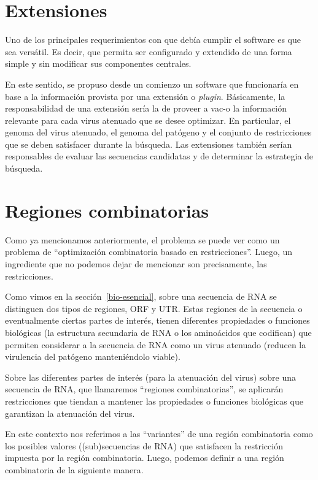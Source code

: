 \section{Extensiones}

Uno de los principales requerimientos con que deb\'ia cumplir el software es
que sea vers\'atil. Es decir, que permita ser configurado y extendido de una
forma simple y sin modificar sus componentes centrales.

En este sentido, se propuso desde un comienzo un software que funcionar\'ia en
base a la informaci\'on provista por una extensi\'on o \textit{plugin}.
B\'asicamente, la responsabilidad de una extensi\'on ser\'ia la de proveer a
\ac{vac-o} la informaci\'on relevante para cada virus atenuado que se desee
optimizar. En particular, el genoma del virus atenuado, el genoma del
pat\'ogeno y el conjunto de restricciones que se deben satisfacer durante la
b\'usqueda. Las extensiones tambi\'en ser\'ian responsables de evaluar las
secuencias candidatas y de determinar la estrategia de b\'usqueda.


\section{Regiones combinatorias}

Como ya mencionamos anteriormente, el problema se puede ver como un problema de
``optimizaci\'on combinatoria basado en restricciones''. Luego, un ingrediente
que no podemos dejar de mencionar son precisamente, las restricciones. 

Como vimos en la secci\'on~\ref{bio-esencial}, sobre una secuencia de \ac{RNA}
se distinguen dos tipos de regiones, \ac{ORF} y \ac{UTR}. Estas regiones de la
secuencia o eventualmente ciertas partes de inter\'es, tienen diferentes
propiedades o funciones biol\'ogicas (la estructura secundaria de \ac{RNA} o
los amino\'acidos que codifican) que permiten considerar a la secuencia de
\ac{RNA} como un virus atenuado (reducen la virulencia del pat\'ogeno
manteni\'endolo viable).

Sobre las diferentes partes de inter\'es (para la atenuaci\'on del virus)
sobre una secuencia de \ac{RNA}, que llamaremos ``regiones combinatorias'', se
aplicar\'an restricciones que tiendan a mantener las propiedades o funciones
biol\'ogicas que garantizan la atenuaci\'on del virus. 

En este contexto nos referimos a las ``variantes'' de una regi\'on combinatoria
como los posibles valores ((sub)secuencias de \ac{RNA}) que satisfacen la
restricci\'on impuesta por la regi\'on combinatoria. Luego, podemos definir a
una regi\'on combinatoria de la siguiente manera.

